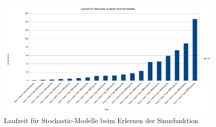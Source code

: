 \begin{figure}[htbp]
	\centering
	\includegraphics[angle=-90,totalheight=\textheight]{images/charts/StochasticGradientTimeSinus.png}
	\caption{Laufzeit für Stochastic-Modelle beim Erlernen der Sinusfunktion}
\end{figure}